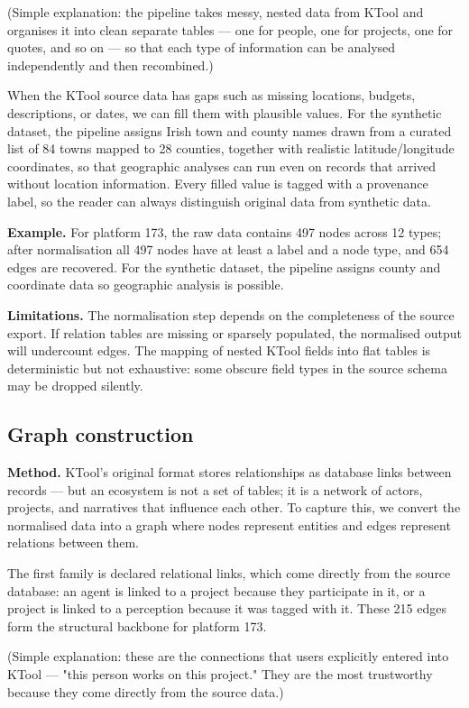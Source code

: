 \documentclass[11pt,a4paper]{article}
\begin{document}
(Simple explanation: the pipeline takes messy, nested data from KTool
and organises it into clean separate tables — one for people, one for
projects, one for quotes, and so on — so that each type of information
can be analysed independently and then recombined.)

When the KTool source data has gaps such as missing locations, budgets,
descriptions, or dates, we can fill them with plausible values. For the
synthetic dataset, the pipeline assigns Irish town and county names
drawn from a curated list of 84 towns mapped to 28 counties, together
with realistic latitude/longitude coordinates, so that geographic
analyses can run even on records that arrived without location
information. Every filled value is tagged with a provenance label, so
the reader can always distinguish original data from synthetic data.

\textbf{Example.} For platform 173, the raw data contains 497 nodes across 12
types; after normalisation all 497 nodes have at least a label and a
node type, and 654 edges are recovered. For the synthetic dataset, the
pipeline assigns county and coordinate data so geographic analysis is
possible.

\textbf{Limitations.} The normalisation step depends on the completeness of
the source export. If relation tables are missing or sparsely populated,
the normalised output will undercount edges. The mapping of nested KTool
fields into flat tables is deterministic but not exhaustive: some
obscure field types in the source schema may be dropped silently.

\subsection{Graph construction}

\textbf{Method.} KTool's original format stores relationships as database
links between records — but an ecosystem is not a set of tables; it is a
network of actors, projects, and narratives that influence each other.
To capture this, we convert the normalised data into a graph where nodes
represent entities and edges represent relations between them.

The first family is declared relational links, which come directly from
the source database: an agent is linked to a project because they
participate in it, or a project is linked to a perception because it was
tagged with it. These 215 edges form the structural backbone for
platform 173.

(Simple explanation: these are the connections that users explicitly
entered into KTool — "this person works on this project." They are the
most trustworthy because they come directly from the source data.)
\end{document}

